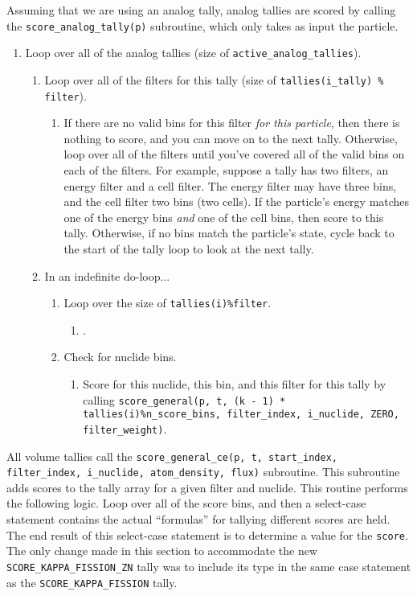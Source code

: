 \documentclass[10pt]{article}
\numberwithin{equation}{section} %
\begin{document}
Assuming that we are using an analog tally, analog tallies are scored by calling the {\tt score\_analog\_tally(p)} subroutine, which only takes as input the particle. 

\begin{enumerate}
\item Loop over all of the analog tallies (size of {\tt active\_analog\_tallies}).
	\begin{enumerate}
	\item Loop over all of the filters for this tally (size of {\tt tallies(i\_tally) \% filter}).
		\begin{enumerate}
			\item If there are no valid bins for this filter {\it for this particle}, then there is nothing to score, and you can move on to the next tally. Otherwise, loop over all of the filters until you've covered all of the valid bins on each of the filters. For example, suppose a tally has two filters, an energy filter and a cell filter. The energy filter may have three bins, and the cell filter two bins (two cells). If the particle's energy matches one of the energy bins {\it and} one of the cell bins, then score to this tally. Otherwise, if no bins match the particle's state, cycle back to the start of the tally loop to look at the next tally.
		\end{enumerate}
	\item In an indefinite do-loop...
		\begin{enumerate}
		\item Loop over the size of {\tt tallies(i)\%filter}.
			\begin{enumerate}
			\item .
			\end{enumerate} 
		\item Check for nuclide bins.
			\begin{enumerate}
			\item Score for this nuclide, this bin, and this filter for this tally by calling {\tt score\_general(p, t, (k - 1) * tallies(i)\%n\_score\_bins, filter\_index, i\_nuclide, ZERO, filter\_weight)}. 
			\end{enumerate}
		\end{enumerate}
	\end{enumerate}
\end{enumerate}

All volume tallies call the {\tt score\_general\_ce(p, t, start\_index, filter\_index, i\_nuclide, atom\_density, flux)} subroutine. This subroutine adds scores to the tally array for a given filter and nuclide. This routine performs the following logic. Loop over all of the score bins, and then a select-case statement contains the actual ``formulas'' for tallying different scores are held. The end result of this select-case statement is to determine a value for the {\tt score}. The only change made in this section to accommodate the new {\tt SCORE\_KAPPA\_FISSION\_ZN} tally was to include its type in the same case statement as the {\tt SCORE\_KAPPA\_FISSION} tally. 
\end{document}
